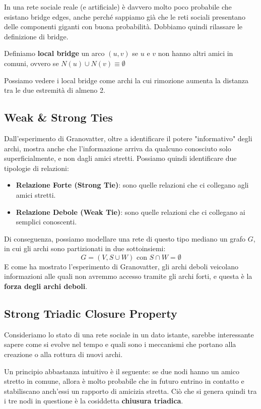 In una rete sociale reale (e artificiale) è davvero molto poco probabile che esistano bridge edges, anche perché sappiamo già che le reti sociali presentano delle componenti giganti con buona probabilità. Dobbiamo quindi rilassare le definizione di bridge.

\begin{definizione}
    Definiamo \textbf{local bridge} un arco $(u,v)$ se $u$ e $v$ non hanno altri amici in comuni, ovvero se $N(u) \cup N(v) \equiv \emptyset$
    
    Possiamo vedere i local bridge come archi la cui rimozione aumenta la distanza tra le due estremità di almeno 2.
\end{definizione}

\subsection{Weak \& Strong Ties}

Dall'esperimento di Granovatter, oltre a identificare il potere "informativo" degli archi, mostra anche che l'informazione arriva da qualcuno conosciuto solo superficialmente, e non dagli amici stretti. Possiamo quindi identificare due tipologie di relazioni: 
\begin{itemize}
    \item \textbf{Relazione Forte (Strong Tie)}: sono quelle relazioni che ci collegano agli amici stretti.
    \item \textbf{Relazione Debole (Weak Tie)}: sono quelle relazioni che ci collegano ai semplici conoscenti.
\end{itemize}
Di conseguenza, possiamo modellare una rete di questo tipo mediano un grafo $G$, in cui gli archi sono partizionati in due sottoinsiemi:
\[
G = (V, S \cup W) \text{ con } S \cap W = \emptyset
\]
E come ha mostrato l'esperimento di Granovatter, gli archi deboli veicolano informazioni alle quali non avremmo accesso tramite gli archi forti, e questa è la \textbf{forza degli archi deboli}.

\subsection{Strong Triadic Closure Property}

Consideriamo lo stato di una rete sociale in un dato istante, sarebbe interessante sapere come si evolve nel tempo e quali sono i meccanismi che portano alla creazione o alla rottura di nuovi archi.

Un principio abbastanza intuitivo è il seguente: se due nodi hanno un amico stretto in comune, allora è molto probabile che in futuro entrino in contatto e stabiliscano anch'essi un rapporto di amicizia stretta. Ciò che si genera quindi tra i tre nodi in questione è la cosiddetta \textbf{chiusura triadica}.

